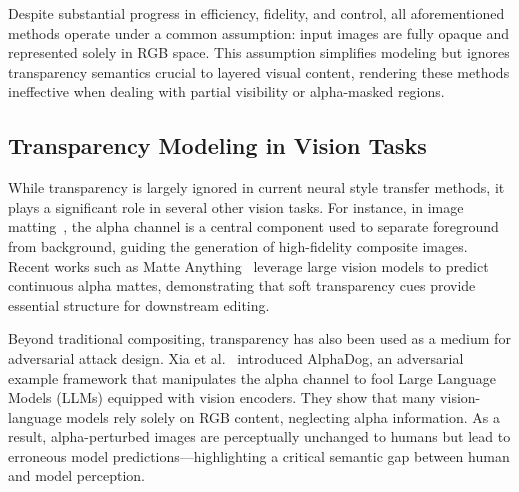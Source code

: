 \documentclass[letterpaper]{article} %
\begin{document}
Despite substantial progress in efficiency, fidelity, and control, all aforementioned methods operate under a common assumption: input images are fully opaque and represented solely in RGB space. This assumption simplifies modeling but ignores transparency semantics crucial to layered visual content, rendering these methods ineffective when dealing with partial visibility or alpha-masked regions.

\subsection{Transparency Modeling in Vision Tasks}

While transparency is largely ignored in current neural style transfer methods, it plays a significant role in several other vision tasks. For instance, in image matting~\cite{yao2024matte}, the alpha channel is a central component used to separate foreground from background, guiding the generation of high-fidelity composite images. Recent works such as Matte Anything~\cite{yao2024matte} leverage large vision models to predict continuous alpha mattes, demonstrating that soft transparency cues provide essential structure for downstream editing.

Beyond traditional compositing, transparency has also been used as a medium for adversarial attack design. Xia et al.~\cite{xia2025alphadog} introduced AlphaDog, an adversarial example framework that manipulates the alpha channel to fool Large Language Models (LLMs) equipped with vision encoders. They show that many vision-language models rely solely on RGB content, neglecting alpha information. As a result, alpha-perturbed images are perceptually unchanged to humans but lead to erroneous model predictions—highlighting a critical semantic gap between human and model perception.
\end{document}
